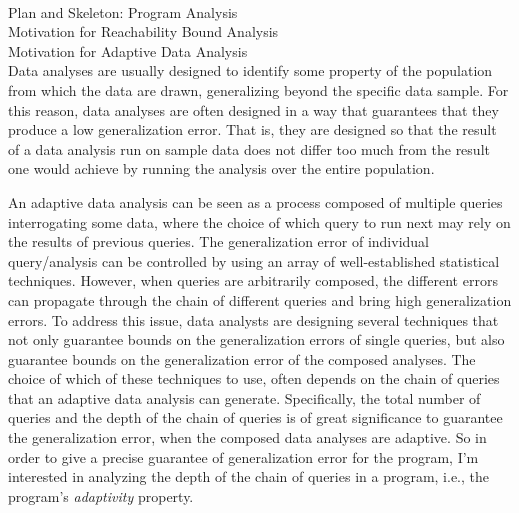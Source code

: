 \begin{abstractpage}

  \\
  Plan and Skeleton: Program Analysis 
  \\
  Motivation for Reachability Bound Analysis 
  \\
  Motivation for Adaptive Data Analysis
  \\
   Data analyses are usually designed to identify some property of the population 
   from which the data are drawn, generalizing beyond the specific data sample. 
  For this reason, data analyses are often designed in a way that guarantees that they produce a low generalization error.
 That is, they are designed so that the result of a data analysis run on sample data does not differ too much from the result one would achieve by running the analysis over the entire population. 
 
 An adaptive data analysis can be seen as a process composed of multiple queries interrogating some data, where the choice of which query to run next may rely on the results of previous queries. 
 The generalization error of individual query/analysis can be controlled by using an array of well-established statistical techniques.
 However, when queries are arbitrarily composed, the different errors can propagate through the chain of different queries and bring high generalization errors. 
 To address this issue, data analysts are designing several techniques that not only guarantee bounds on the generalization errors of single queries, but also guarantee bounds on the generalization error of the composed analyses. 
 The choice of which of these techniques to use, 
 often depends on the chain of queries that an adaptive data analysis can generate.
 Specifically, the total number of queries and the depth of the chain of queries is of great significance 
 to guarantee the generalization error, 
 when the composed data analyses are adaptive. 
 So in order to give a precise guarantee of generalization error
 for the program,
 I'm interested in analyzing the depth of the chain of queries in a program, i.e., the program's \emph{adaptivity} property.


\end{abstractpage}
